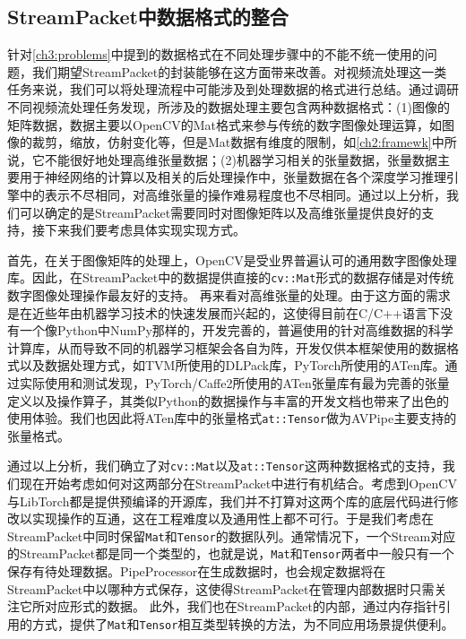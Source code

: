 \subsection{StreamPacket中数据格式的整合}
针对\ref{ch3:problems}中提到的数据格式在不同处理步骤中的不能不统一使用的问题，我们期望StreamPacket的封装能够在这方面带来改善。对视频流处理这一类任务来说，我们可以将处理流程中可能涉及到处理数据的格式进行总结。通过调研不同视频流处理任务发现，所涉及的数据处理主要包含两种数据格式：(1)图像的矩阵数据，数据主要以OpenCV的Mat格式来参与传统的数字图像处理运算，如图像的裁剪，缩放，仿射变化等，但是Mat数据有维度的限制，如\ref{ch2:framewk}中所说，它不能很好地处理高维张量数据；(2)机器学习相关的张量数据，张量数据主要用于神经网络的计算以及相关的后处理操作中，张量数据在各个深度学习推理引擎中的表示不尽相同，对高维张量的操作难易程度也不尽相同。通过以上分析，我们可以确定的是StreamPacket需要同时对图像矩阵以及高维张量提供良好的支持，接下来我们要考虑具体实现实现方式。\par

首先，在关于图像矩阵的处理上，OpenCV是受业界普遍认可的通用数字图像处理库。因此，在StreamPacket中的数据提供直接的\texttt{cv::Mat}形式的数据存储是对传统数字图像处理操作最友好的支持。
再来看对高维张量的处理。由于这方面的需求是在近些年由机器学习技术的快速发展而兴起的，这使得目前在C/C++语言下没有一个像Python中NumPy那样的，开发完善的，普遍使用的针对高维数据的科学计算库，从而导致不同的机器学习框架会各自为阵，开发仅供本框架使用的数据格式以及数据处理方式，如TVM所使用的DLPack\cite{dlpack}库，PyTorch所使用的ATen库。通过实际使用和测试发现，PyTorch/Caffe2所使用的ATen张量库有最为完善的张量定义以及操作算子，其类似Python的数据操作与丰富的开发文档也带来了出色的使用体验。我们也因此将ATen库中的张量格式\texttt{at::Tensor}做为AVPipe主要支持的张量格式。\par

通过以上分析，我们确立了对\texttt{cv::Mat}以及\texttt{at::Tensor}这两种数据格式的支持，我们现在开始考虑如何对这两部分在StreamPacket中进行有机结合。考虑到OpenCV与LibTorch都是提供预编译的开源库，我们并不打算对这两个库的底层代码进行修改以实现操作的互通，这在工程难度以及通用性上都不可行。于是我们考虑在StreamPacket中同时保留\texttt{Mat}和\texttt{Tensor}的数据队列。通常情况下，一个Stream对应的StreamPacket都是同一个类型的，也就是说，\texttt{Mat}和\texttt{Tensor}两者中一般只有一个保存有待处理数据。PipeProcessor在生成数据时，也会规定数据将在StreamPacket中以哪种方式保存，这使得StreamPacket在管理内部数据时只需关注它所对应形式的数据。
此外，我们也在StreamPacket的内部，通过内存指针引用的方式，提供了\texttt{Mat}和\texttt{Tensor}相互类型转换的方法，为不同应用场景提供便利。

